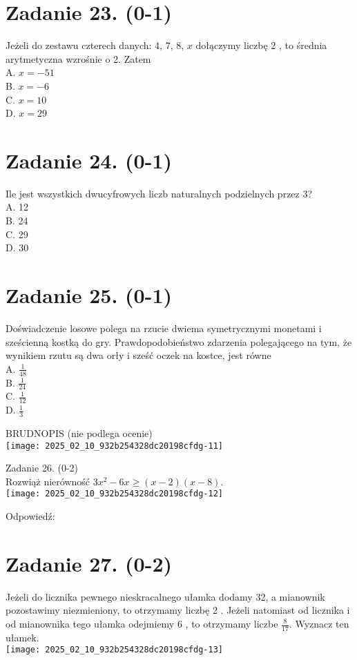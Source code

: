 \documentclass[10pt]{article}
\begin{document}
\section*{Zadanie 23. (0-1)}
Jeżeli do zestawu czterech danych: 4, 7, 8, \(x\) dołączymy liczbę 2 , to średnia arytmetyczna wzrośnie o 2. Zatem\\
A. \(x=-51\)\\
B. \(x=-6\)\\
C. \(x=10\)\\
D. \(x=29\)

\section*{Zadanie 24. (0-1)}
Ile jest wszystkich dwucyfrowych liczb naturalnych podzielnych przez 3?\\
A. 12\\
B. 24\\
C. 29\\
D. 30

\section*{Zadanie 25. (0-1)}
Doświadczenie losowe polega na rzucie dwiema symetrycznymi monetami i sześcienną kostką do gry. Prawdopodobieństwo zdarzenia polegającego na tym, że wynikiem rzutu są dwa orły i sześć oczek na kostce, jest równe\\
A. \(\frac{1}{48}\)\\
B. \(\frac{1}{24}\)\\
C. \(\frac{1}{12}\)\\
D. \(\frac{1}{3}\)

BRUDNOPIS (nie podlega ocenie)\\
\texttt{[image: 2025\_02\_10\_932b254328dc20198cfdg-11]}

Zadanie 26. (0-2)\\
Rozwiąż nierówność \(3 x^{2}-6 x \geq(x-2)(x-8)\).\\
\texttt{[image: 2025\_02\_10\_932b254328dc20198cfdg-12]}

Odpowiedź:

\section*{Zadanie 27. (0-2)}
Jeżeli do licznika pewnego nieskracalnego ułamka dodamy 32, a mianownik pozostawimy niezmieniony, to otrzymamy liczbę 2 . Jeżeli natomiast od licznika i od mianownika tego ułamka odejmiemy 6 , to otrzymamy liczbe \(\frac{8}{17}\). Wyznacz ten ułamek.\\
\texttt{[image: 2025\_02\_10\_932b254328dc20198cfdg-13]}
\end{document}
